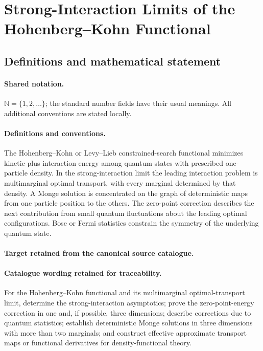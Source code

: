 \documentclass[11pt]{article}
\begin{document}
\section{Strong-Interaction Limits of the Hohenberg–Kohn Functional}\label{statement}

\subsection{Definitions and mathematical statement}

\paragraph{Shared notation.}$\mathbb N=\{1,2,\ldots\}$; the standard number fields have their usual meanings. All additional conventions are stated locally.


\paragraph{Definitions and conventions.}
The Hohenberg--Kohn or Levy--Lieb constrained-search functional minimizes kinetic plus interaction energy among quantum states with prescribed one-particle density. In the strong-interaction limit the leading interaction problem is multimarginal optimal transport, with every marginal determined by that density. A Monge solution is concentrated on the graph of deterministic maps from one particle position to the others. The zero-point correction describes the next contribution from small quantum fluctuations about the leading optimal configurations. Bose or Fermi statistics constrain the symmetry of the underlying quantum state.

\paragraph{Target retained from the canonical source catalogue.}
\paragraph{Catalogue wording retained for traceability.}
For the Hohenberg–Kohn functional and its multimarginal optimal-transport limit, determine the strong-interaction asymptotics; prove the zero-point-energy correction in one and, if possible, three dimensions; describe corrections due to quantum statistics; establish deterministic Monge solutions in three dimensions with more than two marginals; and construct effective approximate transport maps or functional derivatives for density-functional theory.
\end{document}
